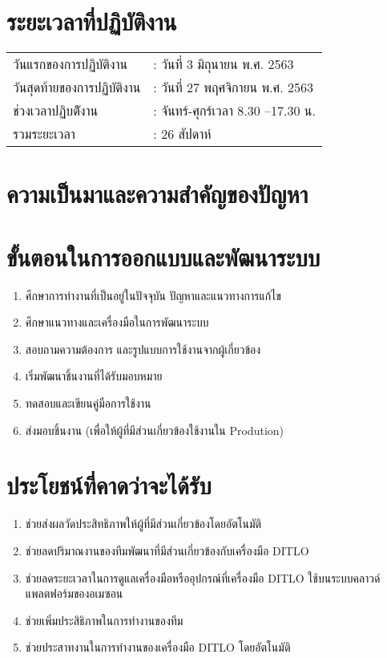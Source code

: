\newpage
\section{ระยะเวลาที่ปฏิบัติงาน}
\begin{table}[h]
    \begin{tabular}{ll}
        วันแรกของการปฏิบัติงาน & : วันที่ 3 มิถุนายน พ.ศ. 2563 \\
        วันสุดท้ายของการปฏิบัติงาน & : วันที่ 27 พฤศจิกายน พ.ศ. 2563 \\
        ช่วงเวลาปฏิบตัิงาน & : จันทร์-ศุกร์เวลา 8.30 –17.30 น. \\
        รวมระยะเวลา & : 26 สัปดาห์ \\    
    \end{tabular}
\end{table}

\section{ความเป็นมาและความสำคัญของปัญหา}

\section{ขั้นตอนในการออกแบบและพัฒนาระบบ}
\begin{enumerate}
    \item ศีกษาการทำงานที่เป็นอยู่ในปัจจุบัน ปัญหาและแนวทางการแก้ไข
    \item ศึกษาแนวทางและเครื่องมือในการพัฒนาระบบ
    \item สอบถามความต้องการ และรูปแบบการใช้งานจากผู้เกี่ยวข้อง
    \item เริ่มพัฒนาชิ้นงานที่ได้รับมอบหมาย
    \item ทดสอบและเขียนคู่มือการใช้งาน
    \item ส่งมอบชิ้นงาน (เพื่อให้ผู้ที่มีส่วนเกี่ยวข้องใช้งานใน Prodution)
\end{enumerate}

\section{ประโยชน์ที่คาดว่าจะได้รับ}
\begin{enumerate}
    \item ช่วยส่งผลวัดประสิทธิภาพให้ผู้ที่มีส่วนเกี่ยวข้องโดยอัตโนมัติ
    \item ช่วยลดปริมาณงานของทีมพัฒนาที่มีส่วนเกี่ยวข้องกับเครื่องมือ DITLO
    \item ช่วยลดระยะเวลาในการดูแลเครื่องมือหรืออุปกรณ์ที่เครื่องมือ DITLO ใช้บนระบบคลาวด์แพลตฟอร์มของอเมซอน
    \item ช่วยเพิ่มประสิธิภาพในการทำงานของทีม
    \item ช่วยประสาทงานในการทำงานของเครื่องมือ DITLO โดยอัตโนมัติ
\end{enumerate}









